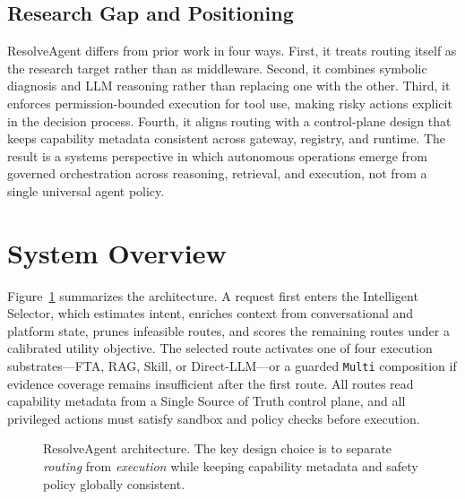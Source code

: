 \documentclass[conference]{IEEEtran}
\begin{document}
\subsection{Research Gap and Positioning}
ResolveAgent differs from prior work in four ways. First, it treats routing itself as the research target rather than as middleware. Second, it combines symbolic diagnosis and LLM reasoning rather than replacing one with the other. Third, it enforces permission-bounded execution for tool use, making risky actions explicit in the decision process. Fourth, it aligns routing with a control-plane design that keeps capability metadata consistent across gateway, registry, and runtime. The result is a systems perspective in which autonomous operations emerge from governed orchestration across reasoning, retrieval, and execution, not from a single universal agent policy.

\section{System Overview}
Figure~\ref{fig:overview} summarizes the architecture. A request first enters the Intelligent Selector, which estimates intent, enriches context from conversational and platform state, prunes infeasible routes, and scores the remaining routes under a calibrated utility objective. The selected route activates one of four execution substrates---FTA, RAG, Skill, or Direct-LLM---or a guarded \texttt{Multi} composition if evidence coverage remains insufficient after the first route. All routes read capability metadata from a Single Source of Truth control plane, and all privileged actions must satisfy sandbox and policy checks before execution.

\begin{figure}[t]
\centering
\small
{}
\caption{ResolveAgent architecture. The key design choice is to separate \emph{routing} from \emph{execution} while keeping capability metadata and safety policy globally consistent.}
\label{fig:overview}
\end{figure}
\end{document}
